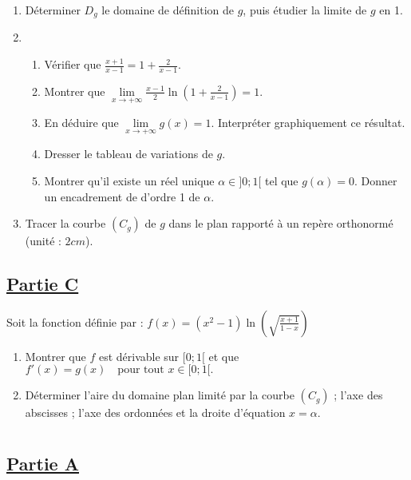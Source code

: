 \begin{enumerate}
    \item Déterminer \( D_g \) le domaine de définition de \( g \), puis étudier la limite de \( g \) en 1.
    \item
          \begin{enumerate}
              \item Vérifier que \( \frac{x+1}{x-1} = 1 + \frac{2}{x-1}. \)

              \item Montrer que \( \lim\limits_{x \to +\infty} \frac{x-1}{2} \ln \left( 1 + \frac{2}{x-1} \right) = 1. \)
              \item En déduire que \(         \lim\limits_{x \to +\infty} g(x) = 1. \)
                    Interpréter graphiquement ce résultat.
              \item Dresser le tableau de variations de \( g \).
              \item Montrer qu’il existe un réel unique \( \alpha \in ]0;1[ \) tel que \( g(\alpha) = 0 \). Donner un encadrement de d’ordre 1 de \( \alpha \).
          \end{enumerate}
    \item Tracer la courbe \( (C_g) \) de \( g \) dans le plan rapporté à un repère orthonormé (unité : \( 2cm \)).
\end{enumerate}

\subsection*{\underline{\textbf{Partie C}}}

Soit la fonction définie par : \( f(x) = (x^2 - 1) \ln \left( \sqrt{\frac{x+1}{1-x}} \right) \)

\begin{enumerate}
    \item Montrer que \( f \) est dérivable sur \( [0;1[ \) et que  \(     f'(x) = g(x) \quad \text{pour tout } x \in [0;1[. \)
    \item Déterminer l’aire du domaine plan limité par la courbe \( (C_g) \) ; l’axe des abscisses ; l’axe des ordonnées et la droite d’équation \( x = \alpha \).
\end{enumerate}
\section*{}

\subsection*{\underline{\textbf{Partie A}}}

